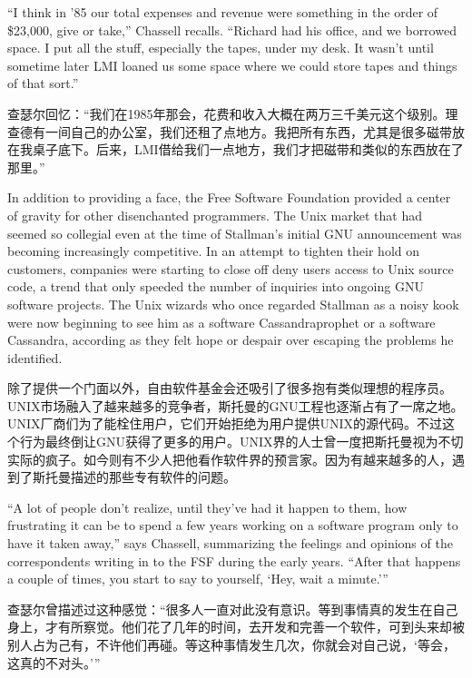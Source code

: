 \ifdefined\eng
``I think in '85 our total expenses and revenue were something in the order of \$23,000, give or take,'' Chassell recalls. ``Richard had his office, and we borrowed space. I put all the stuff, especially the tapes, under my desk. It wasn't until sometime later LMI loaned us some space where we could store tapes and things of that sort.''
\fi

\ifdefined\chs
查瑟尔回忆：``我们在1985年那会，花费和收入大概在两万三千美元这个级别。理查德有一间自己的办公室，我们还租了点地方。我把所有东西，尤其是很多磁带放在我桌子底下。后来，LMI借给我们一点地方，我们才把磁带和类似的东西放在了那里。''
\fi

\ifdefined\eng
In addition to providing a face, the Free Software Foundation provided a center of gravity for other disenchanted programmers. The Unix market that had seemed so collegial even at the time of Stallman's initial GNU announcement was becoming increasingly competitive. In an attempt to tighten their hold on customers, companies were starting to \ifdefined\vone close off \fi\ifdefined\vtwo deny \fi users access to Unix source code, a trend that only speeded the number of inquiries into ongoing GNU software projects. The Unix wizards who once regarded Stallman as a noisy kook were now beginning to see him as a software \ifdefined\vone Cassandra\fi\ifdefined\vtwo prophet or a software Cassandra, according as they felt hope or despair over escaping the problems he identified\fi.
\fi

\ifdefined\chs
除了提供一个门面以外，自由软件基金会还吸引了很多抱有类似理想的程序员。UNIX市场融入了越来越多的竞争者，斯托曼的GNU工程也逐渐占有了一席之地。UNIX厂商们为了能栓住用户，它们开始拒绝为用户提供UNIX的源代码。不过这个行为最终倒让GNU获得了更多的用户。UNIX界的人士曾一度把斯托曼视为不切实际的疯子。如今则有不少人把他看作软件界的预言家。\ifdefined\vtwo 因为有越来越多的人，遇到了斯托曼描述的那些专有软件的问题。\fi
\fi

\ifdefined\eng
``A lot of people don't realize, until they've had it happen to them, how frustrating it can be to spend a few years working on a software program only to have it taken away,'' says Chassell, summarizing the feelings and opinions of the correspondents writing in to the FSF during the early years. ``After that happens a couple of times, you start to say to yourself, `Hey, wait a minute.'\hspace{0.01in}''
\fi

\ifdefined\chs
查瑟尔曾描述过这种感觉：``很多人一直对此没有意识。等到事情真的发生在自己身上，才有所察觉。他们花了几年的时间，去开发和完善一个软件，可到头来却被别人占为己有，不许他们再碰。等这种事情发生几次，你就会对自己说，`等会，这真的不对头。'\hspace{0.01in}''
\fi

